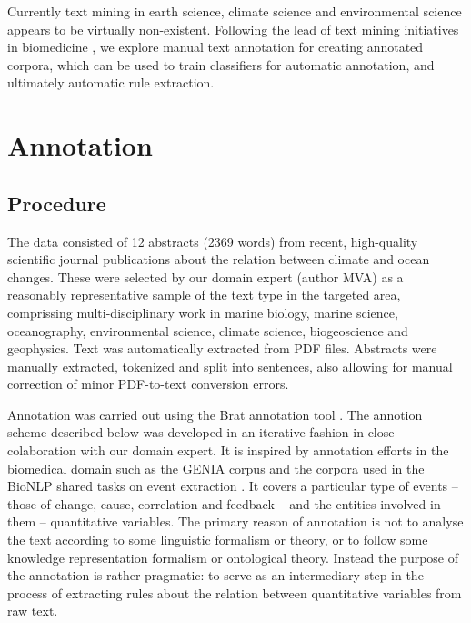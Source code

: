 \documentclass[10pt, a4paper]{article}
\begin{document}
Currently text mining in earth science, climate science and environmental science appears to be virtually non-existent. 
Following the lead of text mining initiatives in biomedicine \cite{Kim2009Overview}, we explore manual text annotation for creating annotated corpora, which can be used to train classifiers for automatic annotation, and ultimately automatic rule extraction.

\section{Annotation}
\label{sec:annot}

\subsection{Procedure}

The data consisted of 12 abstracts (2369 words) from recent, high-quality scientific journal publications about the relation between climate and ocean changes. 
These were selected by our domain expert (author MVA) as a reasonably representative sample of the text type in the targeted area, comprissing multi-disciplinary work in marine biology, marine science, oceanography, environmental science, climate science, biogeoscience and geophysics.
Text was automatically extracted from PDF files.
Abstracts were manually extracted, tokenized and split into sentences, also allowing for manual correction of minor PDF-to-text conversion errors.

Annotation was carried out using the Brat annotation tool \cite{stenetorp2012}.
The annotion scheme described below was developed in an iterative fashion in close colaboration with our domain expert.
It is inspired by annotation efforts in the biomedical domain such as the GENIA corpus \cite{Kim2003GENIA} and the corpora used in the BioNLP shared tasks on event extraction \cite{Kim2009Overview}.
It covers a particular type of events -- those of change, cause, correlation and feedback -- and the entities involved in them -- quantitative variables.
The primary reason of annotation is not to analyse the text according to some linguistic formalism or theory, or to follow some knowledge representation formalism or ontological theory.
Instead the purpose of the annotation is rather pragmatic: to serve as an intermediary step in the process of extracting rules about the relation between quantitative variables from raw text.      
 
\end{document}
